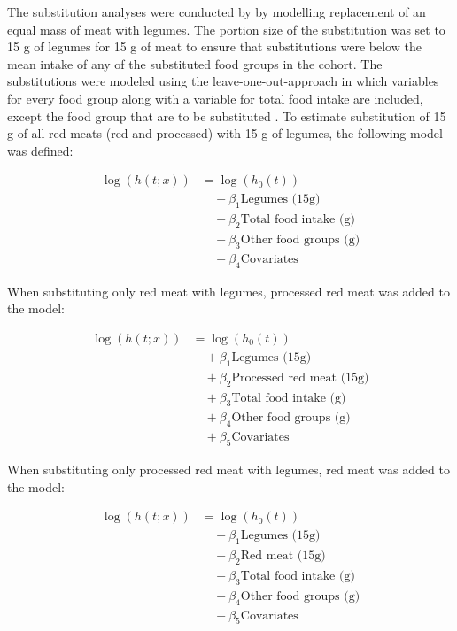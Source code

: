 \documentclass[sn-basic,Numbered,iicol,pdflatex]{sn-jnl}
\begin{document}
The substitution analyses were conducted by by modelling replacement of
an equal mass of meat with legumes. The portion size of the substitution
was set to 15 g of legumes for 15 g of meat to ensure that substitutions
were below the mean intake of any of the substituted food groups in the
cohort. The substitutions were modeled using the leave-one-out-approach
in which variables for every food group along with a variable for total
food intake are included, except the food group that are to be
substituted \citep{Ibsen2021}. To estimate substitution of 15 g of all red
meats (red and processed) with 15 g of legumes, the following model was
defined:

\begin{align}
\log(h(t;x)) &= \log(h_0(t)) \nonumber \\
&\quad + \beta_1 \text{Legumes (15g)} \nonumber \\
&\quad + \beta_2 \text{Total food intake (g)} \nonumber \\
&\quad + \beta_3 \text{Other food groups (g)} \nonumber \\
&\quad + \beta_4 \text{Covariates}
\end{align}

\noindent When substituting only red meat with legumes, processed red
meat was added to the model:

\begin{align}
\log(h(t;x)) &= \log(h_0(t)) \nonumber \\
&\quad + \beta_1 \text{Legumes (15g)} \nonumber \\
&\quad + \beta_2 \text{Processed red meat (15g)} \nonumber \\
&\quad + \beta_3 \text{Total food intake (g)} \nonumber \\
&\quad + \beta_4 \text{Other food groups (g)} \nonumber \\
&\quad + \beta_5 \text{Covariates}
\end{align}

\noindent When substituting only processed red meat with legumes, red
meat was added to the model:

\begin{align}
\log(h(t;x)) &= \log(h_0(t)) \nonumber \\
&\quad + \beta_1 \text{Legumes (15g)} \nonumber \\
&\quad + \beta_2 \text{Red meat (15g)} \nonumber \\
&\quad + \beta_3 \text{Total food intake (g)} \nonumber \\ 
&\quad + \beta_4 \text{Other food groups (g)} \nonumber \\
&\quad + \beta_5 \text{Covariates}
\end{align}
\end{document}
